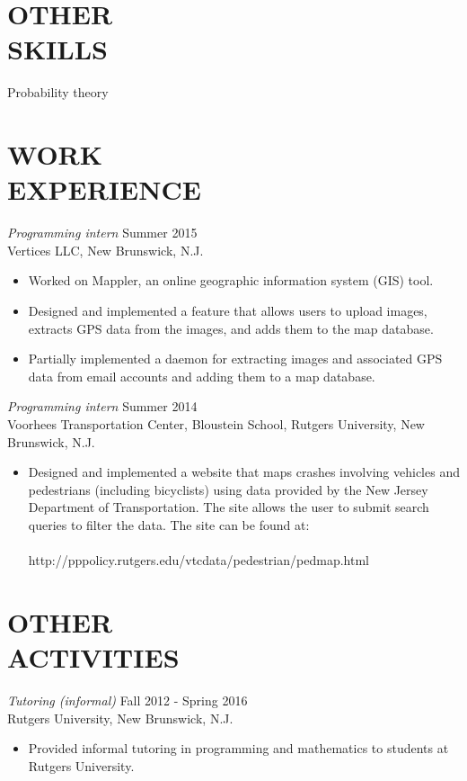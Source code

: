 \documentclass[margin]{res}
\begin{document}
\begin{resume}
\section{OTHER \\ SKILLS}
Probability theory

\section{WORK \\ EXPERIENCE}

{\sl Programming intern} \hfill Summer 2015 \\
Vertices LLC, New Brunswick, N.J.
\begin{itemize}  \itemsep -2pt
\item
Worked on Mappler, an online geographic information system (GIS) tool.
\item
Designed and implemented a feature that allows users to upload images, extracts GPS data from the images, and adds them to the map database.
\item
Partially implemented a daemon for extracting images and associated GPS data from email accounts and adding them to a map database.
\end{itemize}

{\sl Programming intern} \hfill Summer 2014 \\
Voorhees Transportation Center, Bloustein School, Rutgers University, New Brunswick, N.J.
\begin{itemize}  \itemsep -2pt
\item
Designed and implemented a website that maps crashes involving vehicles and pedestrians (including bicyclists) using data provided by the New Jersey Department of Transportation. The site allows the user to submit search queries to filter the data. The site can be found at: \\
\\
http://pppolicy.rutgers.edu/vtcdata/pedestrian/pedmap.html
\end{itemize}

\section{OTHER \\ ACTIVITIES}

{\sl Tutoring (informal)} \hfill Fall 2012 - Spring 2016 \\
Rutgers University, New Brunswick, N.J.
\begin{itemize}  \itemsep -2pt
\item
Provided informal tutoring in programming and mathematics to students at Rutgers University.
\end{itemize}


\end{resume}
\end{document}
